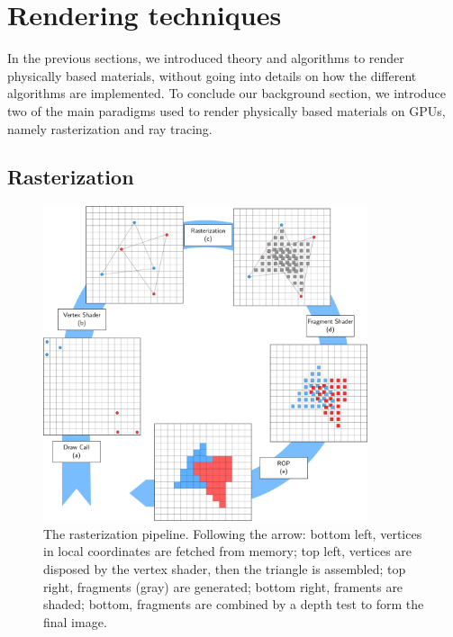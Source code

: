 \section{Rendering techniques} 
\label{sec:renderingparadigms}

In the previous sections, we introduced theory and algorithms to render physically based materials, without going into details on how the different algorithms are implemented. To conclude our background section, we introduce two of the main paradigms used to render physically based materials on GPUs, namely rasterization and ray tracing. 

\subsection{Rasterization}

\begin{figure}
\centering
	 \includegraphics[width=0.85\textwidth]{figures/rasterization_pipeline.pdf} 
\caption{The rasterization pipeline. Following the arrow: bottom left, vertices in local coordinates are fetched from memory; top left, vertices are disposed by the vertex shader, then the triangle is assembled; top right, fragments (gray) are generated; bottom right, framents are shaded; bottom, fragments are combined by a depth test to form the final image. } 
\label{fig:rasterpipeline}
\end{figure}

